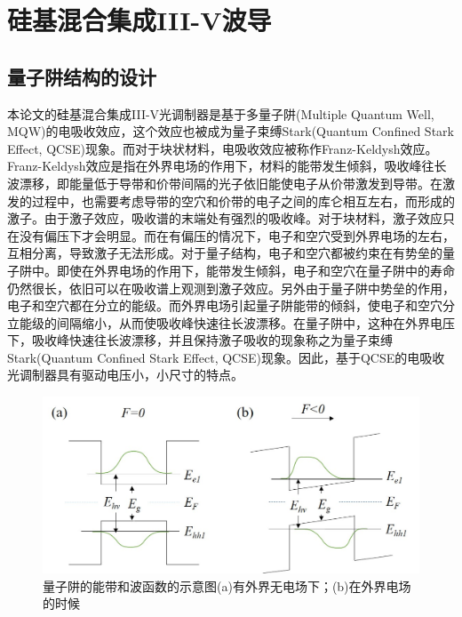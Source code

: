\chapter{硅基混合集成III-V波导}
\section{量子阱结构的设计}
本论文的硅基混合集成III-V光调制器是基于多量子阱(Multiple Quantum Well, MQW)的电吸收效应，这个效应也被成为量子束缚Stark(Quantum Confined Stark Effect, QCSE)现象。而对于块状材料，电吸收效应被称作Franz-Keldysh效应\cite{keldysh1958effect,franz1958einfluss}。Franz-Keldysh效应是指在外界电场的作用下，材料的能带发生倾斜，吸收峰往长波漂移，即能量低于导带和价带间隔的光子依旧能使电子从价带激发到导带。在激发的过程中，也需要考虑导带的空穴和价带的电子之间的库仑相互左右，而形成的激子。由于激子效应，吸收谱的末端处有强烈的吸收峰。对于块材料，激子效应只在没有偏压下才会明显。而在有偏压的情况下，电子和空穴受到外界电场的左右，互相分离，导致激子无法形成。对于量子结构，电子和空穴都被约束在有势垒的量子阱中。即使在外界电场的作用下，能带发生倾斜，电子和空穴在量子阱中的寿命仍然很长，依旧可以在吸收谱上观测到激子效应。另外由于量子阱中势垒的作用，电子和空穴都在分立的能级。而外界电场引起量子阱能带的倾斜，使电子和空穴分立能级的间隔缩小，从而使吸收峰快速往长波漂移。在量子阱中，这种在外界电压下，吸收峰快速往长波漂移，并且保持激子吸收的现象称之为量子束缚Stark(Quantum Confined Stark Effect, QCSE)现象\cite{miller1984band,miller1985electric}。因此，基于QCSE的电吸收光调制器具有驱动电压小，小尺寸的特点。

\begin{figure}[htb]
	\centering
	\includegraphics[width=14cm]{./Pictures/fig_ch2_band_lineup.jpg}
	\caption{ 量子阱的能带和波函数的示意图(a)有外界无电场下；(b)在外界电场的时候}
	\label{fig_ch2_band_lineup}
\end{figure}

